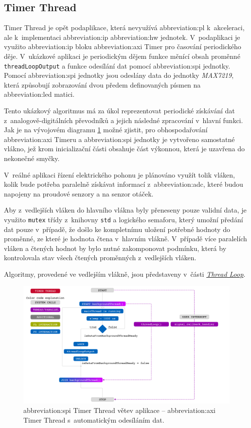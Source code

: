 \documentclass[a4paper, twoside, 11pt]{article}
\begin{document}
	\subsection{Timer Thread}
	Timer Thread je opět podaplikace, která nevyužívá \gls{abbreviation:pl} k~akceleraci, ale k~implementaci \gls{abbreviation:ip} \gls{abbreviation:hw} jednotek. V~podaplikaci je využito \gls{abbreviation:ip} bloku \gls{abbreviation:axi} Timer pro časování periodického děje. V~ukázkové aplikaci je periodickým dějem funkce měnící obsah proměnné \texttt{threadLoopOutput} a funkce odesílání dat pomocí \gls{abbreviation:spi} jednotky. Pomocí \gls{abbreviation:spi} jednotky jsou odeslány data do jednotky \textit{MAX7219}, která způsobují zobrazování dvou předem definovaných písmen na \gls{abbreviation:led} matici.\par
	Tento ukázkový algoritmus má za úkol reprezentovat periodické získávání dat z~analogově-digitálních převodníků a jejich následné zpracování v~hlavní funkci. Jak je na vývojovém diagramu \ref{fig:timer-thread} možné zjistit, pro obhospodařování \gls{abbreviation:axi} Timeru a \gls{abbreviation:spi} jednotky je vytvořeno samostatné vlákno, jež krom inicializační části obsahuje část výkonnou, která je uzavřena do nekonečné smyčky.\par
	V~reálné aplikaci řízení elektrického pohonu je plánováno využít tolik vláken, kolik bude potřeba paralelně získávat informací z~\gls{abbreviation:adc}, které budou napojeny na proudové senzory a na senzor otáček.\par
	Aby z~vedlejších vláken do hlavního vlákna byly přeneseny pouze validní data, je využito \texttt{mutex} třídy z~knihovny \texttt{std} a logického semaforu, který umožní předání dat pouze v~případě, že došlo ke kompletnímu uložení potřebné hodnoty do proměnné, ze které je hodnota čtena v~hlavním vlákně. V~případě více paralelích vláken a čtených hodnot by bylo nutné zakomponovat podmínku, která by kontrolovala stav všech čtených proměnných z~vedlejších vláken.\par
	Algoritmy, provedené ve vedlejším vlákně, jsou představeny v~části \hyperref[subsubsec:thread-loop]{\textit{Thread Loop}}.
	\begin{figure}[htbp!]
	 	\centering
	 	\includegraphics[width=1\textwidth]{src/pdf/timer-thread.pdf}
		\caption{\gls{abbreviation:spi} Timer Thread větev aplikace – \gls{abbreviation:axi} Timer Thread s~automatickým odesíláním dat.}
	 \label{fig:timer-thread}
 \end{figure}
\end{document}
